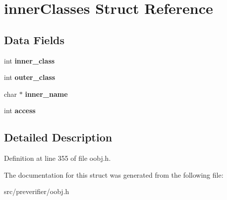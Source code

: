 \section{innerClasses Struct Reference}
\label{structinner_classes}
\subsection*{Data Fields}
\begin{DoxyCompactItemize}
\item 
int {\bfseries inner\_\-class}\label{structinner_classes_a02edcda73495b3f0a35bebe70f2b39e8}

\item 
int {\bfseries outer\_\-class}\label{structinner_classes_ac9944cd885215989776b1b6d2797f114}

\item 
char $\ast$ {\bfseries inner\_\-name}\label{structinner_classes_a6722e366cf4ecfa8284b3e98330cc6c1}

\item 
int {\bfseries access}\label{structinner_classes_a70d4fd20d1196d14b9c001479e6e4ab9}

\end{DoxyCompactItemize}


\subsection{Detailed Description}


Definition at line 355 of file oobj.h.



The documentation for this struct was generated from the following file:\begin{DoxyCompactItemize}
\item 
src/preverifier/oobj.h\end{DoxyCompactItemize}
